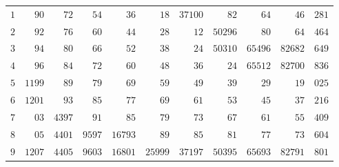 \begin{longtable}{@{}r|r|r|r|r|r|r|r|r|r|r@{}}
$1$ & $90$ & $72$ & $54$ & $36$ & $18$ & $37100$ & $82$ & $64$ & $46$ & $281$\\
$2$ & $92$ & $76$ & $60$ & $44$ & $28$ & $12$ & $50296$ & $80$ & $64$ & $464$\\
$3$ & $94$ & $80$ & $66$ & $52$ & $38$ & $24$ & $50310$ & $65496$ & $82682$ & $649$\\
$4$ & $96$ & $84$ & $72$ & $60$ & $48$ & $36$ & $24$ & $65512$ & $82700$ & $836$\\
$5$ & $1199$ & $89$ & $79$ & $69$ & $59$ & $49$ & $39$ & $29$ & $19$ & $025$\\
$6$ & $1201$ & $93$ & $85$ & $77$ & $69$ & $61$ & $53$ & $45$ & $37$ & $216$\\
$7$ & $03$ & $4397$ & $91$ & $85$ & $79$ & $73$ & $67$ & $61$ & $55$ & $409$\\
$8$ & $05$ & $4401$ & $9597$ & $16793$ & $89$ & $85$ & $81$ & $77$ & $73$ & $604$\\
$9$ & $1207$ & $4405$ & $9603$ & $16801$ & $25999$ & $37197$ & $50395$ & $65693$ & $82791$ & $801$\\
\hline\end{longtable}\endgroup
\clearpage
\begingroup\fontsize{8.5}{10}\selectfont\setlength{\tabcolsep}{2pt}\renewcommand{\arraystretch}{1}

